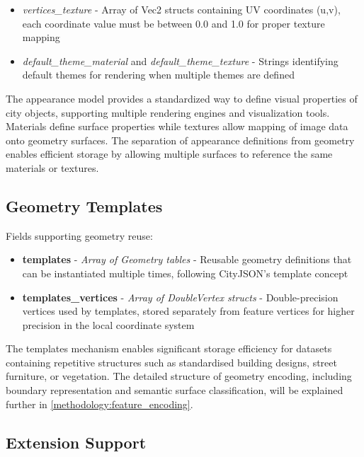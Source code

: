 \begin{itemize}
\begin{itemize}
      \item \textit{vertices\_texture} - Array of Vec2 structs containing UV coordinates (u,v), each coordinate value must be between 0.0 and 1.0 for proper texture mapping

      \item \textit{default\_theme\_material} and \textit{default\_theme\_texture} - Strings identifying default themes for rendering when multiple themes are defined
    \end{itemize}
\end{itemize}

The appearance model provides a standardized way to define visual properties of city objects, supporting multiple rendering engines and visualization tools. Materials define surface properties while textures allow mapping of image data onto geometry surfaces. The separation of appearance definitions from geometry enables efficient storage by allowing multiple surfaces to reference the same materials or textures.

\subsection{Geometry Templates}
\label{methodology:header:geometry_templates}

Fields supporting geometry reuse:

\begin{itemize}
  \item \textbf{templates} - \textit{Array of Geometry tables} - Reusable geometry definitions that can be instantiated multiple times, following CityJSON's template concept \citep{cityjson_spec}

  \item \textbf{templates\_vertices} - \textit{Array of DoubleVertex structs} - Double-precision vertices used by templates, stored separately from feature vertices for higher precision in the local coordinate system \citep{cityjson_spec}
\end{itemize}

The templates mechanism enables significant storage efficiency for datasets containing repetitive structures such as standardised building designs, street furniture, or vegetation. The detailed structure of geometry encoding, including boundary representation and semantic surface classification, will be explained further in \autoref{methodology:feature_encoding}.

\subsection{Extension Support}
\label{methodology:header:extensions}

